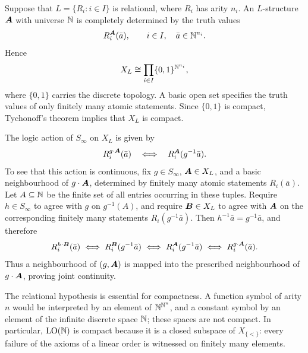 \begin{draftnote}
    Suppose that \(L=\{R_i:i\in I\}\) is relational, where \(R_i\) has arity
    \(n_i\). An \(L\)-structure \(\boldsymbol{A}\) with universe \(\mathbb{N}\) is completely
    determined by the truth values
    \[
        R_i^{\boldsymbol{A}}(\bar a),
        \qquad
        i\in I,\quad \bar a\in\mathbb{N}^{n_i}.
    \]
    Hence
    \[
        X_L
        \cong
        \prod_{i\in I}\{0,1\}^{\mathbb{N}^{n_i}},
    \]
    where \(\{0,1\}\) carries the discrete topology. A basic open set specifies
    the truth values of only finitely many atomic statements. Since
    \(\{0,1\}\) is compact, Tychonoff's theorem implies that \(X_L\) is compact.

    The logic action of \(S_\infty\) on \(X_L\) is given by
    \[
        R_i^{g\cdot\boldsymbol{A}}(\bar a)
        \quad\Longleftrightarrow\quad
        R_i^{\boldsymbol{A}}(g^{-1}\bar a).
    \]
    To see that this action is continuous, fix \(g\in S_\infty\),
    \(\boldsymbol{A}\in X_L\), and a basic neighbourhood of \(g\cdot\boldsymbol{A}\), determined
    by finitely many atomic statements \(R_i(\bar a)\). Let \(A\subseteq\mathbb{N}\)
    be the finite set of all entries occurring in these tuples. Require
    \(h\in S_\infty\) to agree with \(g\) on \(g^{-1}(A)\), and require
    \(\boldsymbol{B}\in X_L\) to agree with \(\boldsymbol{A}\) on the corresponding finitely many
    statements \(R_i(g^{-1}\bar a)\). Then
    \(h^{-1}\bar a=g^{-1}\bar a\), and therefore
    \[
        R_i^{h\cdot\boldsymbol{B}}(\bar a)
        \iff
        R_i^{\boldsymbol{B}}(g^{-1}\bar a)
        \iff
        R_i^{\boldsymbol{A}}(g^{-1}\bar a)
        \iff
        R_i^{g\cdot\boldsymbol{A}}(\bar a).
    \]
    Thus a neighbourhood of \((g,\boldsymbol{A})\) is mapped into the prescribed
    neighbourhood of \(g\cdot\boldsymbol{A}\), proving joint continuity.

    The relational hypothesis is essential for compactness. A function symbol
    of arity \(n\) would be interpreted by an element of
    \(\mathbb{N}^{\mathbb{N}^n}\), and a constant symbol by an element of the infinite discrete
    space \(\mathbb{N}\); these spaces are not compact. In particular,
    \(\operatorname{LO}(\mathbb{N})\) is compact because it is a closed subspace of
    \(X_{\{<\}}\): every failure of the axioms of a linear order is witnessed
    on finitely many elements.
\end{draftnote}

